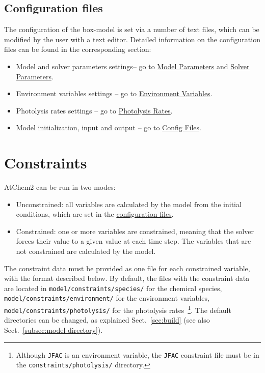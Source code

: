 \subsection{Configuration files} \label{subsec:configuration-files}

The configuration of the box-model is set via a number of text files,
which can be modified by the user with a text editor. Detailed
information on the configuration files can be found in the
corresponding section:

\begin{itemize}
\item Model and solver parameters settings-- go to
  \hyperref[sec:model-parameters]{Model Parameters} and
  \hyperref[sec:solver-parameters]{Solver Parameters}.
\item Environment variables settings -- go to
  \hyperref[sec:environment-variables]{Environment Variables}.
\item Photolysis rates settings -- go to
  \hyperref[sec:photolysis-rates]{Photolysis Rates}.
\item Model initialization, input and output -- go to
  \hyperref[sec:config-files]{Config Files}.
\end{itemize}

\section{Constraints} \label{sec:constraints}

AtChem2 can be run in two modes:

\begin{itemize}
\item Unconstrained: all variables are calculated by the model from
  the initial conditions, which are set in the
  \hyperref[subsec:configuration-files]{configuration files}.
\item Constrained: one or more variables are constrained, meaning that
  the solver forces their value to a given value at each time
  step. The variables that are not constrained are calculated by the
  model.
\end{itemize}

The constraint data must be provided as one file for each constrained
variable, with the format described below. By default, the files with
the constraint data are located in \texttt{model/constraints/species/}
for the chemical species, \texttt{model/constraints/environment/} for
the environment variables, \texttt{model/constraints/photolysis/} for
the photolysis rates~\footnote{Although \texttt{JFAC} is an
  environment variable, the \texttt{JFAC} constraint file must be in
  the \texttt{constraints/photolysis/} directory.}. The default
directories can be changed, as explained Sect.~\ref{sec:build} (see
also Sect.~\ref{subsec:model-directory}).

